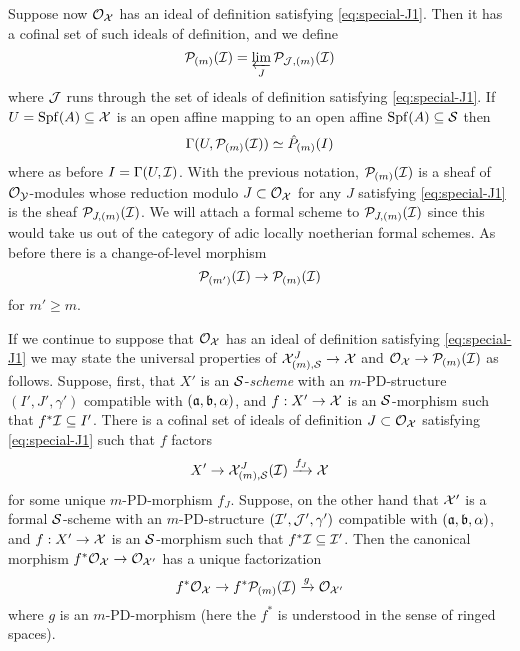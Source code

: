 \documentclass{article}
\theoremstyle{change}
\numberwithin{equation}{subsubsection}
\begin{document}
Suppose now ${\cal O}_{\cal X}$ has an ideal of definition satisfying
\ref{eq:special-J1}. Then it has a cofinal set of such ideals of
definition, and we define
\begin{equation}
  \label{eq:P_A/R-global}
  {\cal P}_{(m)}({\cal I})=\varprojlim_J{\cal P}_{{\cal J},(m)}({\cal I})
\end{equation}
where ${\cal J}$ runs through the set of ideals of definition satisfying
\ref{eq:special-J1}. 
If $U={\operatorname{Spf}({A})}\subseteq{\cal X}$ is an open affine mapping to an open affine
${\operatorname{Spf}({A})}\subseteq{\cal S}$ then
\begin{displaymath}
  \Gamma(U,{\cal P}_{(m)}({\cal I}))\simeq\hat P_{(m)}(I)
\end{displaymath}
where as before $I=\Gamma(U,{\cal I})$. With the previous notation,
${\cal P}_{(m)}({\cal I})$ is a sheaf of ${\cal O}_{\cal Y}$-modules whose reduction modulo
$J\subset{\cal O}_{\cal X}$ for any $J$ satisfying \ref{eq:special-J1} is the
sheaf ${\cal P}_{J,(m)}({\cal I})$. We will attach a formal scheme to
${\cal P}_{J,(m)}({\cal I})$ since this would take us out of the category of
adic locally noetherian formal schemes. As before there is a
change-of-level morphism
\begin{equation}
  \label{eq:Pm-change-of-level}
  {\cal P}_{(m')}({\cal I})\to {\cal P}_{(m)}({\cal I})
\end{equation}
for $m'\ge m$.

If we continue to suppose that ${\cal O}_{\cal X}$ has an ideal of definition
satisfying \ref{eq:special-J1} we may state the universal properties
of ${\cal X}_{(m),{\cal S}}^J\to{\cal X}$ and ${\cal O}_{\cal X}\to{\cal P}_{(m)}({\cal I})$ as
follows. Suppose, first, that $X'$ is an ${\cal S}$-\textit{scheme} with an
$m$-PD-structure $(I',J',\gamma')$ compatible with $({\mathfrak a},{\mathfrak b},\alpha)$,
and $f:X'\to{\cal X}$ is an ${\cal S}$-morphism such that $f^*{\cal I}\subseteq I'$.
There is a cofinal set of ideals of definition $J\subset{\cal O}_{\cal X}$
satisfying \ref{eq:special-J1} such that $f$ factors
\begin{displaymath}
  X'\to {\cal X}_{(m),{\cal S}}^J({\cal I})\xrightarrow{f_J}{\cal X}  
\end{displaymath}
for some unique $m$-PD-morphism $f_J$. Suppose, on the other hand that
${\cal X}'$ is a formal ${\cal S}$-scheme with an $m$-PD-structure
$({\cal I}',{\cal J}',\gamma')$ compatible with $({\mathfrak a},{\mathfrak b},\alpha)$, and
$f:X'\to{\cal X}$ is an ${\cal S}$-morphism such that $f^*{\cal I}\subseteq{\cal I}'$. Then
the canonical morphism $f^*{\cal O}_{\cal X}\to{\cal O}_{{\cal X}'}$ has a unique
factorization
\begin{displaymath}
  f^*{\cal O}_{\cal X}\to f^*{\cal P}_{(m)}({\cal I})\xrightarrow{g}{\cal O}_{{\cal X}'}
\end{displaymath}
where $g$ is an $m$-PD-morphism (here the $f^*$ is understood in the
sense of ringed spaces).
\end{document}
